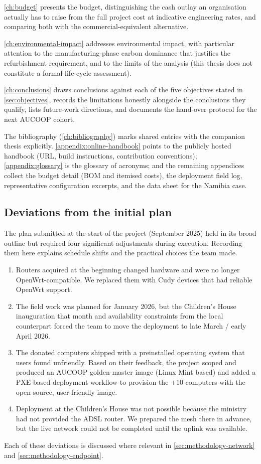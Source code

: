 \autoref{ch:budget} presents the budget, distinguishing the cash outlay
an organisation actually has to raise from the full project cost at
indicative engineering rates, and comparing both with the
commercial-equivalent alternative.

\autoref{ch:environmental-impact} addresses environmental impact, with
particular attention to the manufacturing-phase carbon dominance that
justifies the refurbishment requirement, and to the limits of the
analysis (this thesis does not constitute a formal life-cycle
assessment).

\autoref{ch:conclusions} draws conclusions against each of the five
objectives stated in \autoref{sec:objectives}, records the limitations
honestly alongside the conclusions they qualify, lists future-work
directions, and documents the hand-over protocol for the next AUCOOP
cohort.

The bibliography (\autoref{ch:bibliography}) marks shared entries with
the companion thesis explicitly. \autoref{appendix:online-handbook}
points to the publicly hosted handbook (URL, build instructions,
contribution conventions); \autoref{appendix:glossary} is the glossary
of acronyms; and the remaining appendices collect the budget detail (BOM
and itemised costs), the deployment field log, representative
configuration excerpts, and the data sheet for the Namibia case.

\hypertarget{deviations-from-the-initial-plan}{%
\subsection{Deviations from the initial
plan}\label{deviations-from-the-initial-plan}}

The plan submitted at the start of the project (September 2025) held in
its broad outline but required four significant adjustments during
execution. Recording them here explains schedule shifts and the
practical choices the team made.

\begin{enumerate}
\def\labelenumi{\arabic{enumi}.}
\tightlist
\item
  Routers acquired at the beginning changed hardware and were no longer
  OpenWrt-compatible. We replaced them with Cudy devices that had
  reliable OpenWrt support.
\item
  The field work was planned for January 2026, but the Children's House
  inauguration that month and availability constraints from the local
  counterpart forced the team to move the deployment to late March /
  early April 2026.
\item
  The donated computers shipped with a preinstalled operating system
  that users found unfriendly. Based on their feedback, the project
  scoped and produced an AUCOOP golden-master image (Linux Mint based)
  and added a PXE-based deployment workflow to provision the +10
  computers with the open-source, user-friendly image.
\item
  Deployment at the Children's House was not possible because the
  ministry had not provided the ADSL router. We prepared the mesh there
  in advance, but the live network could not be completed until the
  uplink was available.
\end{enumerate}

Each of these deviations is discussed where relevant in
\autoref{sec:methodology-network} and
\autoref{sec:methodology-endpoint}.
